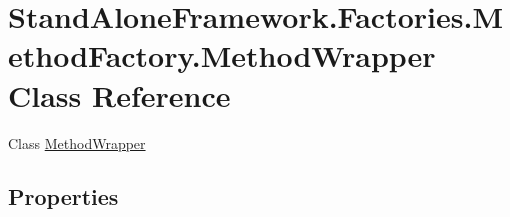 \hypertarget{class_stand_alone_framework_1_1_factories_1_1_method_factory_1_1_method_wrapper}{\section{Stand\+Alone\+Framework.\+Factories.\+Method\+Factory.\+Method\+Wrapper Class Reference}
\label{class_stand_alone_framework_1_1_factories_1_1_method_factory_1_1_method_wrapper}
}


Class \hyperlink{class_stand_alone_framework_1_1_factories_1_1_method_factory_1_1_method_wrapper}{Method\+Wrapper}  


\subsection*{Properties}
